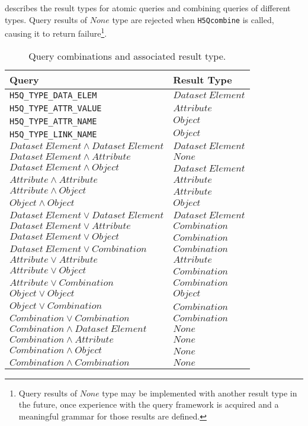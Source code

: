 \documentclass[letterpaper,hyper]{THG_RFC}
\begin{document}
 describes the result types for atomic queries and
combining queries of different types. Query results of $None$ type are rejected
when \texttt{H5Qcombine} is called, causing it to return failure\footnote{Query
results of $None$ type may be implemented with another result type in the
future, once experience with the query framework is acquired and a meaningful
grammar for those results are defined.}.

\begin{table}[ht]\footnotesize
\caption{Query combinations and associated result type.}
\label{tab:querycomb}
\begin{tabular}{ll} \toprule
Query &
Result Type\\ \midrule
\texttt{H5Q\_TYPE\_DATA\_ELEM} & $Dataset~Element$ \\
\texttt{H5Q\_TYPE\_ATTR\_VALUE} & $Attribute$ \\
\texttt{H5Q\_TYPE\_ATTR\_NAME} & $Object$ \\
\texttt{H5Q\_TYPE\_LINK\_NAME} & $Object$ \\
$Dataset~Element \land Dataset~Element$ & $Dataset~Element$ \\
$Dataset~Element \land Attribute$ & $None$ \\
$Dataset~Element \land Object$ & $Dataset~Element$ \\
$Attribute \land Attribute$ & $Attribute$ \\
$Attribute \land Object$ & $Attribute$ \\
$Object \land Object$ & $Object$ \\
$Dataset~Element \lor Dataset~Element$ & $Dataset~Element$ \\
$Dataset~Element \lor Attribute$ & $Combination$ \\
$Dataset~Element \lor Object$ & $Combination$ \\
$Dataset~Element \lor Combination$ & $Combination$ \\
$Attribute \lor Attribute$ & $Attribute$ \\
$Attribute \lor Object$ & $Combination$ \\
$Attribute \lor Combination$ & $Combination$ \\
$Object \lor Object$ & $Object$ \\
$Object \lor Combination$ & $Combination$ \\
$Combination \lor Combination$ & $Combination$ \\
$Combination \land Dataset~Element$ & $None$ \\
$Combination \land Attribute$ & $None$ \\
$Combination \land Object$ & $None$ \\
$Combination \land Combination$ & $None$ \\
\bottomrule
\end{tabular}
\end{table}
\end{document}

